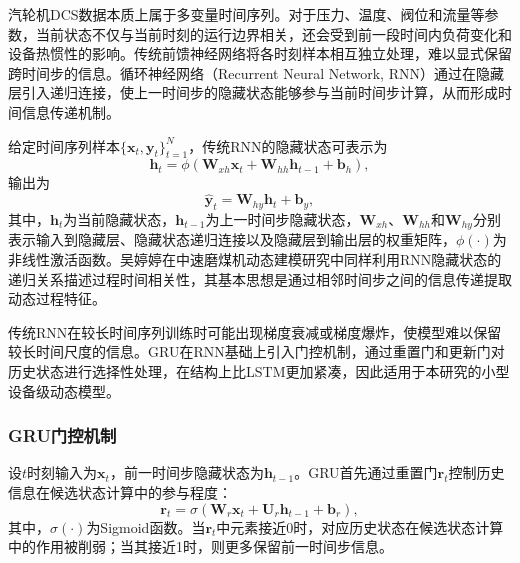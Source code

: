 汽轮机DCS数据本质上属于多变量时间序列。对于压力、温度、阀位和流量等参数，当前状态不仅与当前时刻的运行边界相关，还会受到前一段时间内负荷变化和设备热惯性的影响。传统前馈神经网络将各时刻样本相互独立处理，难以显式保留跨时间步的信息。循环神经网络（Recurrent Neural Network, RNN）通过在隐藏层引入递归连接，使上一时间步的隐藏状态能够参与当前时间步计算，从而形成时间信息传递机制。

给定时间序列样本$\{\mathbf{x}_t,\mathbf{y}_t\}_{t=1}^{N}$，传统RNN的隐藏状态可表示为
\begin{equation}
    \mathbf{h}_t=\phi
    \left(\mathbf{W}_{xh}\mathbf{x}_t+
    \mathbf{W}_{hh}\mathbf{h}_{t-1}+\mathbf{b}_h\right),
\end{equation}
输出为
\begin{equation}
    \hat{\mathbf{y}}_t=
    \mathbf{W}_{hy}\mathbf{h}_t+\mathbf{b}_y,
\end{equation}
其中，$\mathbf{h}_t$为当前隐藏状态，$\mathbf{h}_{t-1}$为上一时间步隐藏状态，$\mathbf{W}_{xh}$、$\mathbf{W}_{hh}$和$\mathbf{W}_{hy}$分别表示输入到隐藏层、隐藏状态递归连接以及隐藏层到输出层的权重矩阵，$\phi(\cdot)$为非线性激活函数。吴婷婷在中速磨煤机动态建模研究中同样利用RNN隐藏状态的递归关系描述过程时间相关性，其基本思想是通过相邻时间步之间的信息传递提取动态过程特征。

传统RNN在较长时间序列训练时可能出现梯度衰减或梯度爆炸，使模型难以保留较长时间尺度的信息。GRU在RNN基础上引入门控机制，通过重置门和更新门对历史状态进行选择性处理，在结构上比LSTM更加紧凑，因此适用于本研究的小型设备级动态模型\cite{Cho2014GRU}。

\subsubsection{GRU门控机制}

设$t$时刻输入为$\mathbf{x}_t$，前一时间步隐藏状态为$\mathbf{h}_{t-1}$。GRU首先通过重置门$\mathbf{r}_t$控制历史信息在候选状态计算中的参与程度：
\begin{equation}
    \mathbf{r}_t=
    \sigma\left(
    \mathbf{W}_r\mathbf{x}_t+
    \mathbf{U}_r\mathbf{h}_{t-1}+
    \mathbf{b}_r
    \right),
    \label{eq:gru_reset_v2}
\end{equation}
其中，$\sigma(\cdot)$为Sigmoid函数。当$\mathbf{r}_t$中元素接近0时，对应历史状态在候选状态计算中的作用被削弱；当其接近1时，则更多保留前一时间步信息。

